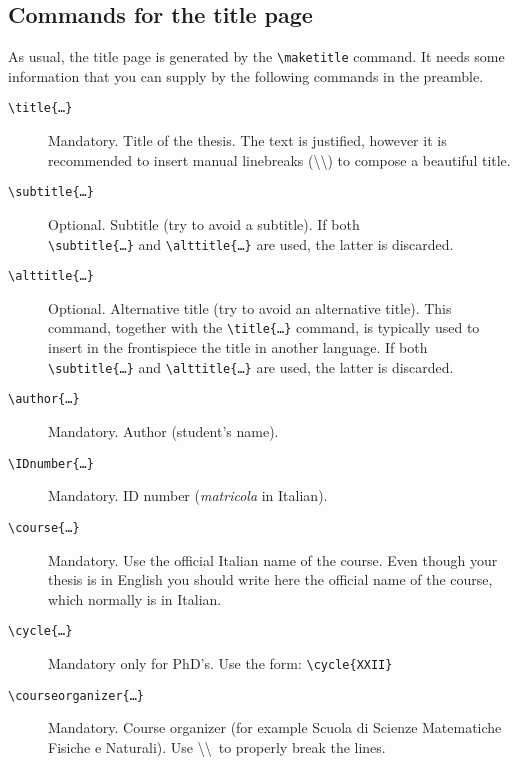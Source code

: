 \documentclass[a5paper,11pt]{article}
\newcommand{\bs}{\textbackslash}
\begin{document}
\subsection[Commands for the\\ title page]{Commands for the title page}
\label{commands_titlepage}

As usual, the title page is generated by the \texttt{\bs maketitle} command.
It needs some information that you can supply by the following commands
in the preamble.
\begin{description}
\item[\texttt{\bs title\{\dots\}}] Mandatory. Title of the thesis. The text is justified, however it is recommended to insert manual linebreaks (\bs\bs) to compose a beautiful title.

\item[\texttt{\bs subtitle\{\dots\}}] Optional. Subtitle (try to avoid a subtitle). If both\\ \texttt{\bs subtitle\{\dots\}} and \texttt{\bs alttitle\{\dots\}} are used, the latter is discarded. 

\item[\texttt{\bs alttitle\{\dots\}}] Optional. Alternative title (try to avoid an alternative title). This command, together with the \texttt{\bs title\{\dots\}} command, is typically used to insert in the frontispiece the title in another language. If both \texttt{\bs subtitle\{\dots\}} and \texttt{\bs alttitle\{\dots\}} are used, the latter is discarded.

\item[\texttt{\bs author\{\dots\}}] Mandatory. Author (student's name).

\item[\texttt{\bs IDnumber\{\dots\}}] Mandatory. ID number (\textit{matricola} in Italian).

\item[\texttt{\bs course\{\dots\}}] Mandatory. Use the official Italian name of the course.
Even though your thesis is in English you should write here the official name of the course, which normally is in Italian.

\item[\texttt{\bs cycle\{\dots\}}] Mandatory only for PhD's. Use the form: \texttt{\bs cycle\{XXII\}}

\item[\texttt{\bs courseorganizer\{\dots\}}] Mandatory. Course organizer (for example Scuola di Scienze Matematiche Fisiche e Naturali). Use \bs\bs\ to properly break the lines.


\end{description}
\end{document}

